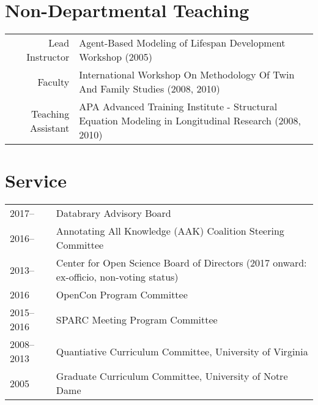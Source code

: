 \documentclass[11pt]{article}
\begin{document}
\section*{Non-Departmental Teaching}
\begin{tabularx}{\textwidth}{rX}
    Lead Instructor		& \textbullet \hspace{.25em} Agent-Based Modeling of Lifespan Development Workshop (2005)\\
    Faculty						& \textbullet \hspace{.25em} International Workshop On Methodology Of Twin And Family Studies (2008, 2010)\\
    Teaching Assistant	& \textbullet \hspace{.25em} APA Advanced Training Institute - Structural Equation Modeling in Longitudinal Research (2008, 2010)\\
\end{tabularx}

\section*{Service}
\begin{tabularx}{\textwidth}{lX}
2017--				& Databrary Advisory Board\\
2016--      		& Annotating All Knowledge (AAK) Coalition Steering Committee\\
2013--				& Center for Open Science Board of Directors (2017 onward: ex-officio, non-voting status)\\
2016	      		& OpenCon Program Committee\\
2015--2016  	& SPARC Meeting Program Committee\\
2008--2013  	& Quantiative Curriculum Committee, University of Virginia\\
2005        		& Graduate Curriculum Committee, University of Notre Dame\\
\end{tabularx}
\end{document}
